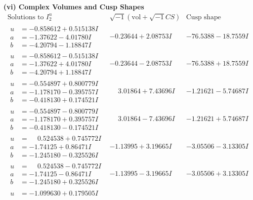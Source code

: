 \documentclass[1p]{elsarticle_modified}
\theoremstyle{definition}
\newcommand{\I}{\sqrt{-1}}
\begin{document}
\newpage\flushleft \textbf{(vi) Complex Volumes and Cusp Shapes}
$$\begin{array}{c|c|c}  
\text{Solutions to }I^u_{2}& \I (\text{vol} + \sqrt{-1}CS) & \text{Cusp shape}\\
 \hline 
\begin{aligned}
u &= -0.858612 + 0.515138 I \\
a &= -1.37622 - 4.01780 I \\
b &= -4.20794 - 1.18847 I\end{aligned}
 & -0.23644 + 2.08753 I & -76.5388 - 18.7559 I \\ \hline\begin{aligned}
u &= -0.858612 - 0.515138 I \\
a &= -1.37622 + 4.01780 I \\
b &= -4.20794 + 1.18847 I\end{aligned}
 & -0.23644 - 2.08753 I & -76.5388 + 18.7559 I \\ \hline\begin{aligned}
u &= -0.554897 + 0.800779 I \\
a &= -1.178170 - 0.395757 I \\
b &= -0.418130 + 0.174521 I\end{aligned}
 & \phantom{-}3.01864 + 7.43696 I & -1.21621 - 5.74687 I \\ \hline\begin{aligned}
u &= -0.554897 - 0.800779 I \\
a &= -1.178170 + 0.395757 I \\
b &= -0.418130 - 0.174521 I\end{aligned}
 & \phantom{-}3.01864 - 7.43696 I & -1.21621 + 5.74687 I \\ \hline\begin{aligned}
u &= \phantom{-}0.524538 + 0.745772 I \\
a &= -1.74125 + 0.86471 I \\
b &= -1.245180 - 0.325526 I\end{aligned}
 & -1.13995 + 3.19665 I & -3.05506 - 3.13305 I \\ \hline\begin{aligned}
u &= \phantom{-}0.524538 - 0.745772 I \\
a &= -1.74125 - 0.86471 I \\
b &= -1.245180 + 0.325526 I\end{aligned}
 & -1.13995 - 3.19665 I & -3.05506 + 3.13305 I \\ \hline\begin{aligned}
u &= -1.099630 + 0.179505 I \\

\end{aligned}
\end{array}$$
\end{document}
